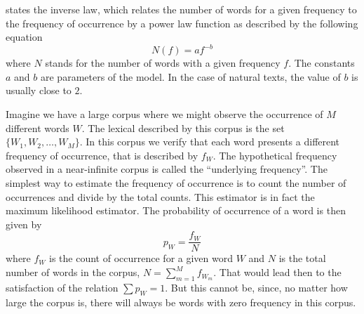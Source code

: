 
\cite{zipf1935} states the inverse law, which relates the number of words for a given frequency
to the frequency of occurrence by a power law function as described by the following equation 
\begin{equation}
N(f) = a f^{-b}
\end{equation}
where $N$ stands for the number of words with a given frequency $f$.
The constants $a$ and $b$ are parameters of the model. In the case of
natural texts, the value of $b$ is usually close to $2$.



%
%
%

Imagine we have a large corpus where we might observe the occurrence of $M$ different words $W$.
The lexical described by this corpus is the set $\{W_1, W_2, \ldots, W_M\}$.
In this corpus we verify that each word presents a different frequency of occurrence,
that is described by $f_W$. The hypothetical frequency observed in a near-infinite corpus
is called the ``underlying frequency''. The simplest way to estimate the frequency of occurrence
is to count the number of occurrences and divide by the total counts. This estimator is
in fact the maximum likelihood estimator.
The probability of occurrence of a word is then given by
\begin{equation}
\label{eq:mle_prob}
p_W = \frac{f_W}{N}
\end{equation}
where $f_W$ is the count of occurrence for a given word $W$ and 
$N$ is the total number of words
in the corpus, $N = \sum_{m=1}^{M} f_{W_m}$. That would lead then to the satisfaction of the
relation $\sum p_W = 1$. But this cannot be, since, no matter how large the corpus is, there
will always be words with zero frequency in this corpus.

